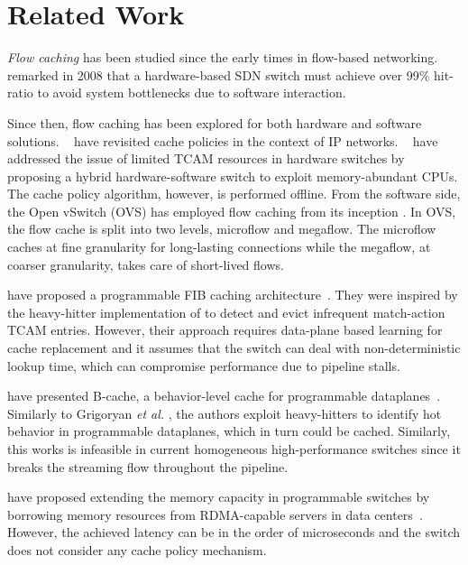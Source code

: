 \section{Related Work}\label{sec:related_works}

\textit{Flow caching} has been studied since the early times in flow-based networking.
\citeauthor{casado:2008}~\cite{casado:2008} remarked in 2008 that a hardware-based SDN switch must achieve over 99\% hit-ratio to avoid system bottlenecks due to software interaction.

Since then, flow caching has been explored for both hardware and software solutions.
\citeauthor{Kim:09}~\cite{Kim:09} have revisited cache policies in the context of IP networks.
\citeauthor{Katta:2014}~\cite{Katta:2014,Katta:2016} have addressed the issue of limited TCAM resources in hardware switches by proposing a hybrid hardware-software switch to exploit memory-abundant CPUs.
The cache policy algorithm, however, is performed offline. 
From the software side, the Open vSwitch (OVS) has employed flow caching from its inception \cite{Pfaff:15}.
In OVS, the flow cache is split into two levels, microflow and megaflow.
The microflow caches at fine granularity for long-lasting connections while the megaflow, at coarser granularity, takes care of short-lived flows.

\citeauthor{Grigoryan:18} have proposed a programmable FIB caching architecture~\cite{Grigoryan:18}. They were inspired by the heavy-hitter implementation of \cite{Sivaraman:17} to detect and evict infrequent match-action TCAM entries. However, their approach requires data-plane based learning for cache replacement and it assumes that the switch can deal with non-deterministic lookup time, which can compromise performance due to pipeline stalls. 

\citeauthor{Zhang:2018} have presented B-cache, a behavior-level cache for programmable dataplanes~\cite{Zhang:2018}. Similarly to Grigoryan \textit{et al.} \cite{Grigoryan:18}, the authors exploit heavy-hitters to identify hot behavior in programmable dataplanes, which in turn could be cached. Similarly, this works is infeasible in current homogeneous high-performance switches since it breaks the streaming flow throughout the pipeline.

\citeauthor{Kim:2018} have proposed extending the memory capacity in programmable switches by borrowing memory resources from RDMA-capable servers in data centers~\cite{Kim:2018}. However, the achieved latency can be in the order of microseconds and the switch does not consider any cache policy mechanism.

